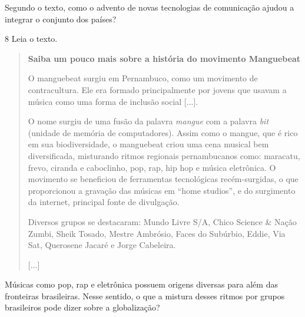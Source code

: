 Segundo o texto, como o advento de novas tecnologias de comunicação
ajudou a integrar o conjunto dos países?



\num{8} Leia o texto.

\begin{quote}
\textbf{Saiba um pouco mais sobre a história do movimento Manguebeat}

O manguebeat surgiu em Pernambuco, como um movimento de
contracultura. Ele era formado principalmente por jovens que usavam a
música como uma forma de inclusão social {[}...{]}.

O nome surgiu de uma fusão da palavra \emph{mangue} com a palavra \emph{bit}
(unidade de memória de computadores). Assim como o mangue, que é rico em
sua biodiversidade, o manguebeat criou uma cena musical bem
diversificada, misturando ritmos regionais pernambucanos como: maracatu,
frevo, ciranda e caboclinho, pop, rap, hip hop e música eletrônica. O
movimento se beneficiou de ferramentas tecnológicas recém-surgidas, o
que proporcionou a gravação das músicas em ``home studios'', e do
surgimento da internet, principal fonte de divulgação.

Diversos grupos se destacaram: Mundo Livre S/A, Chico Science \&
Nação Zumbi, Sheik Tosado, Mestre Ambrósio, Faces do Subúrbio, Eddie,
Via Sat, Querosene Jacaré e Jorge Cabeleira.

{[}...{]}

\end{quote}

Músicas como pop, rap e eletrônica possuem origens diversas para além das
fronteiras brasileiras. Nesse sentido, o que a mistura desses ritmos por
grupos brasileiros pode dizer sobre a globalização?



